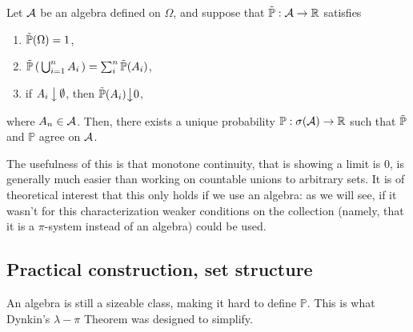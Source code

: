 \goodbreak\begin{my_lemma}
	Let $\mathcal{A}$ be an algebra defined on $\Omega$, and suppose that $\tilde{\mathbb{P}}:\mathcal{A}\to\mathbb{R}$ satisfies
	\begin{enumerate}
		\item $\tilde{\mathbb{P}}(\Omega)=1$,
		\item $\tilde{\mathbb{P}} \left( \, \bigcup^n_{i=1} A_i \, \right) = \sum^n_i \tilde{\mathbb{P}}(A_i)$,
		\item if $A_i \, \big \downarrow \, \emptyset$, then $\tilde{\mathbb{P}}(A_i) \big \downarrow0$,
	\end{enumerate}
	where $A_n\in\mathcal{A}$.
	Then, there exists a unique probability $\mathbb{P}: \sigma ( \mathcal{A} ) \to \mathbb{R}$ such that $\tilde{\mathbb{P}}$ and $\mathbb{P}$ agree on $\mathcal{A}$.
\end{my_lemma}
\begin{my_remark}
	The usefulness of this is that monotone continuity, that is showing a limit is $0$, is generally much easier than working on countable unions to arbitrary sets. 
	It is of theoretical interest that this only holds if we use an algebra: as we will see, if it wasn't for this characterization weaker conditions on the collection (namely, that it is a $\pi$-system instead of an algebra) could be used.
\end{my_remark}

\subsection{Practical construction, set structure}

An algebra is still a sizeable class, making it hard to define $\mathbb{P}$. This is what Dynkin’s $\lambda-\pi$ Theorem was designed to simplify.

